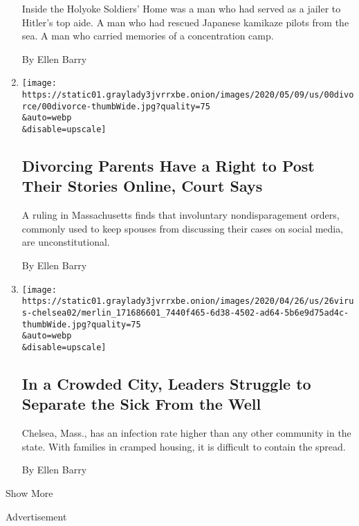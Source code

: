\begin{enumerate}
  Inside the Holyoke Soldiers' Home was a man who had served as a jailer
  to Hitler's top aide. A man who had rescued Japanese kamikaze pilots
  from the sea. A man who carried memories of a concentration camp.

  By Ellen Barry
\item
  \href{/2020/05/09/us/divorcing-parents-have-right-to-post-court-says.html}{}

  \texttt{[image: https://static01.graylady3jvrrxbe.onion/images/2020/05/09/us/00divorce/00divorce-thumbWide.jpg?quality=75\\\&auto=webp\\\&disable=upscale]}

  \hypertarget{divorcing-parents-have-a-right-to-post-their-stories-online-court-says}{%
  \subsection{Divorcing Parents Have a Right to Post Their Stories
  Online, Court
  Says}\label{divorcing-parents-have-a-right-to-post-their-stories-online-court-says}}

  A ruling in Massachusetts finds that involuntary nondisparagement
  orders, commonly used to keep spouses from discussing their cases on
  social media, are unconstitutional.

  By Ellen Barry
\item
  \href{/2020/04/25/us/coronavirus-chelsea-massachusetts.html}{}

  \texttt{[image: https://static01.graylady3jvrrxbe.onion/images/2020/04/26/us/26virus-chelsea02/merlin\_171686601\_7440f465-6d38-4502-ad64-5b6e9d75ad4c-thumbWide.jpg?quality=75\\\&auto=webp\\\&disable=upscale]}

  \hypertarget{in-a-crowded-city-leaders-struggle-to-separate-the-sick-from-the-well}{%
  \subsection{In a Crowded City, Leaders Struggle to Separate the Sick
  From the
  Well}\label{in-a-crowded-city-leaders-struggle-to-separate-the-sick-from-the-well}}

  Chelsea, Mass., has an infection rate higher than any other community
  in the state. With families in cramped housing, it is difficult to
  contain the spread.

  By Ellen Barry
\end{enumerate}

Show More

Advertisement

